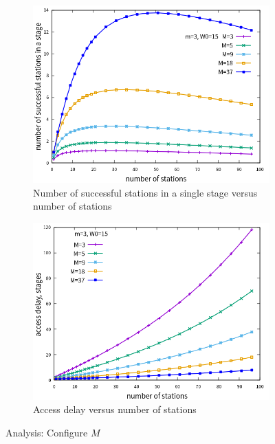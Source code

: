 \begin{figure}[!h]
\begin{subfigure}{\textwidth}  
\centering
\includegraphics[scale=.85]{./figure/chp4/n_M_ns_perf.png}
\caption{Number of successful stations in a single stage versus number of stations}
\label{fig_n_M_ns}
\end{subfigure}

\begin{subfigure}{\textwidth}  
\centering
\includegraphics[scale=.85]{./figure/chp4/n_M_delay_perf.png}
\caption{Access delay versus number of stations}
\label{fig_n_M_delay}
\end{subfigure}
\caption{Analysis: Configure $M$}
\end{figure}


